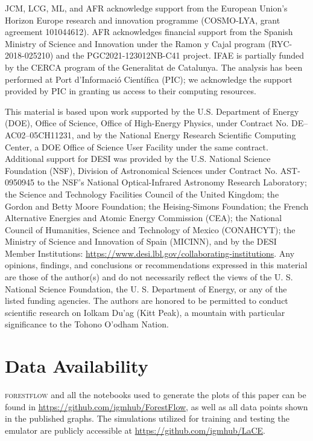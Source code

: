 \documentclass{aa}
\newcommand{\forestflow}{\textsc{forestflow}\xspace}
\begin{document}

\begin{acknowledgements}
JCM, LCG, ML, and AFR acknowledge support from the European Union’s Horizon Europe research and innovation programme (COSMO-LYA, grant agreement 101044612). AFR acknowledges financial support from the Spanish Ministry of Science and Innovation under the Ramon y Cajal program (RYC-2018-025210) and the PGC2021-123012NB-C41 project. IFAE is partially funded by the CERCA program of the Generalitat de Catalunya. The analysis has been performed at Port d’Informaci\'o Cient\'ifica (PIC); we acknowledge the support provided by PIC in granting us access to their computing resources.

This material is based upon work supported by the U.S. Department of Energy (DOE), Office of Science, Office of High-Energy Physics, under Contract No. DE–AC02–05CH11231, and by the National Energy Research Scientific Computing Center, a DOE Office of Science User Facility under the same contract. Additional support for DESI was provided by the U.S. National Science Foundation (NSF), Division of Astronomical Sciences under Contract No. AST-0950945 to the NSF’s National Optical-Infrared Astronomy Research Laboratory; the Science and Technology Facilities Council of the United Kingdom; the Gordon and Betty Moore Foundation; the Heising-Simons Foundation; the French Alternative Energies and Atomic Energy Commission (CEA); the National Council of Humanities, Science and Technology of Mexico (CONAHCYT); the Ministry of Science and Innovation of Spain (MICINN), and by the DESI Member Institutions: \url{https://www.desi.lbl.gov/collaborating-institutions}. Any opinions, findings, and conclusions or recommendations expressed in this material are those of the author(s) and do not necessarily reflect the views of the U. S. National Science Foundation, the U. S. Department of Energy, or any of the listed funding agencies. The authors are honored to be permitted to conduct scientific research on Iolkam Du’ag (Kitt Peak), a mountain with particular significance to the Tohono O’odham Nation.
\end{acknowledgements}

\section*{Data Availability}

\forestflow and all the notebooks used to generate the plots of this paper can be found in \url{https://github.com/igmhub/ForestFlow}, as well as all data points shown in the published graphs. The simulations utilized for training and testing the emulator are publicly accessible at \url{https://github.com/igmhub/LaCE}.
\end{document}
